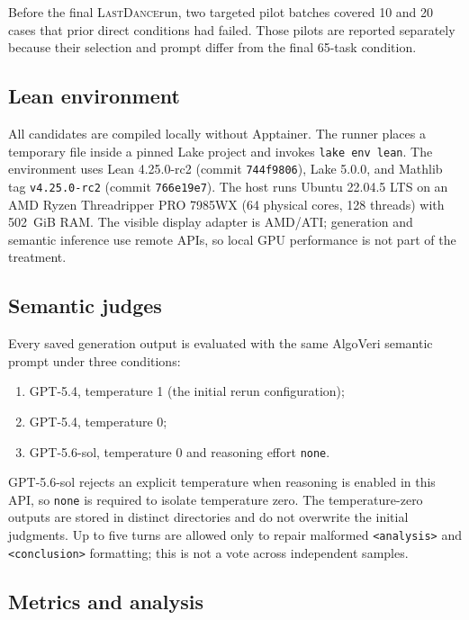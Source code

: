 \documentclass{article}
\newcommand{\model}[1]{\textsf{#1}}
\newcommand{\lastdance}{\textsc{LastDance}}
\begin{document}
Before the final \lastdance run, two targeted pilot batches covered 10 and 20 cases that prior
direct conditions had failed.  Those pilots are reported separately because their
selection and prompt differ from the final 65-task condition.

\subsection{Lean environment}

All candidates are compiled locally without Apptainer.  The runner places a temporary
file inside a pinned Lake project and invokes \texttt{lake env lean}.  The environment
uses Lean 4.25.0-rc2 (commit \texttt{744f9806}), Lake 5.0.0, and Mathlib tag
\texttt{v4.25.0-rc2} (commit \texttt{766e19e7}).  The host runs Ubuntu 22.04.5 LTS on an
AMD Ryzen Threadripper PRO 7985WX (64 physical cores, 128 threads) with 502~GiB RAM.
The visible display adapter is AMD/ATI; generation and semantic inference use remote
APIs, so local GPU performance is not part of the treatment.

\subsection{Semantic judges}

Every saved generation output is evaluated with the same AlgoVeri semantic prompt under
three conditions:

\begin{enumerate}[leftmargin=*,itemsep=2pt]
  \item \model{GPT-5.4}, temperature 1 (the initial rerun configuration);
  \item \model{GPT-5.4}, temperature 0;
  \item \model{GPT-5.6-sol}, temperature 0 and reasoning effort \texttt{none}.
\end{enumerate}

GPT-5.6-sol rejects an explicit temperature when reasoning is enabled in this API, so
\texttt{none} is required to isolate temperature zero.  The temperature-zero outputs
are stored in distinct directories and do not overwrite the initial judgments.  Up to
five turns are allowed only to repair malformed \texttt{<analysis>} and
\texttt{<conclusion>} formatting; this is not a vote across independent samples.

\subsection{Metrics and analysis}
\end{document}
